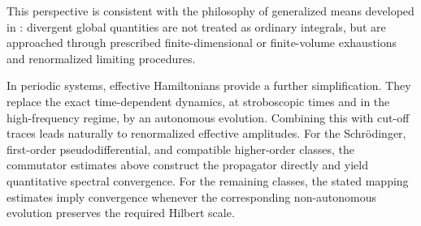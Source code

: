 \documentclass[11pt]{amsart}
\theoremstyle{plain}
\theoremstyle{definition}
\theoremstyle{remark}
\begin{document}
This perspective is consistent with the philosophy of generalized
means developed in \cite{Magnot2017MeanValue}: divergent global
quantities are not treated as ordinary integrals, but are approached
through prescribed finite-dimensional or finite-volume exhaustions and
renormalized limiting procedures.

In periodic systems, effective Hamiltonians provide a further
simplification.  They replace the exact time-dependent dynamics, at
stroboscopic times and in the high-frequency regime, by an autonomous
evolution.  Combining this with cut-off traces leads naturally to
renormalized effective amplitudes.  For the Schr\"odinger, first-order pseudodifferential, and compatible
higher-order classes, the commutator estimates above construct the
propagator directly and yield quantitative spectral convergence.  For
the remaining classes, the stated mapping estimates imply convergence
whenever the corresponding non-autonomous evolution preserves the
required Hilbert scale.

\end{document}
